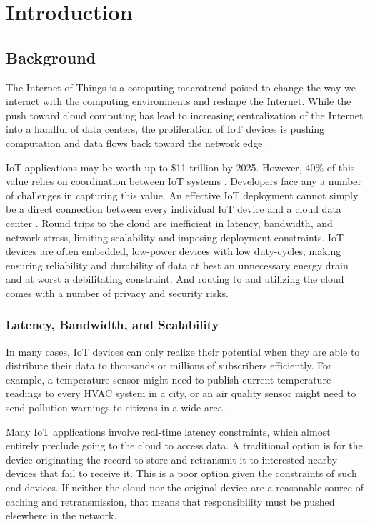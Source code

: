 \chapter{Introduction}

\section{Background}

The Internet of Things is a computing macrotrend poised to change the way we interact with the computing environments and reshape the Internet. While the push toward cloud computing has lead to increasing centralization of the Internet into a handful of data centers, the proliferation of IoT devices is pushing computation and data flows back toward the network edge.

IoT applications may be worth up to \$11 trillion by 2025. However, 40\% of this value relies on coordination between IoT systems \cite{McKinsey}. Developers face any a number of challenges in capturing this value. An effective IoT deployment cannot simply be a direct connection between every individual IoT device and a cloud data center \cite{kubi}. Round trips to the cloud are inefficient in  latency, bandwidth, and network stress, limiting scalability and imposing deployment constraints. IoT devices are often embedded, low-power devices with low duty-cycles, making ensuring reliability and durability of data at best an unnecessary energy drain and at worst a debilitating constraint. And routing to and utilizing the cloud comes with a number of privacy and security risks.

\subsection{Latency, Bandwidth, and Scalability}
In many cases, IoT devices can only realize their potential when they are able to distribute their data to thousands or millions of subscribers efficiently. For example, a temperature sensor might need to publish current temperature readings to every HVAC system in a city, or an air quality sensor might need to send pollution warnings to citizens in a wide area. 

Many IoT applications involve real-time latency constraints, which almost entirely preclude going to the cloud to access data.  A traditional option is for the device originating the record to store and retransmit it to interested nearby devices that fail to receive it.  This is a poor option given the constraints of such end-devices.  If neither the cloud nor the original device are a reasonable source of caching and retransmission, that means that responsibility must be pushed elsewhere in the network.

